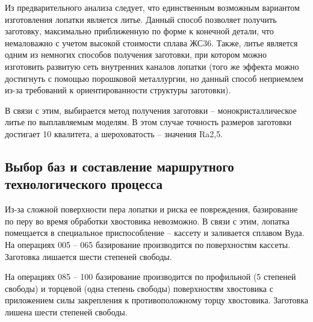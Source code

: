 Из предварительного анализа следует, что единственным возможным вариантом изготовления лопатки является литье. Данный способ позволяет получить заготовку, максимально приближенную по форме к конечной детали, что немаловажно с учетом высокой стоимости сплава ЖС36. Также, литье является одним из немногих способов получения заготовки, при котором можно изготовить развитую сеть внутренних каналов лопатки (того же эффекта можно достигнуть с помощью порошковой металлургии, но данный способ неприемлем из-за требований к ориентированности структуры заготовки).

В связи с этим, выбирается метод получения заготовки – монокристаллическое литье по выплавляемым моделям. В этом случае точность размеров заготовки достигает 10 квалитета, а шероховатость – значения Ra2,5.

\subsection{Выбор баз и составление маршрутного технологического процесса}

Из-за сложной поверхности пера лопатки и риска ее повреждения, базирование по перу во время обработки хвостовика невозможно. В связи с этим, лопатка помещается в специальное приспособление – кассету и заливается сплавом Вуда. На операциях 005 – 065 базирование производится по поверхностям кассеты. Заготовка лишается шести степеней свободы.

На операциях 085 – 100 базирование производится по профильной (5 степеней свободы) и торцевой (одна степень свободы) поверхностям хвостовика с приложением силы закрепления к противоположному торцу хвостовика. Заготовка лишена шести степеней свободы.